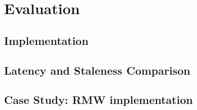 \section{Evaluation}
\label{sec:eval}
\subsection{Implementation}
\subsection{Latency and Staleness Comparison}
\subsection{Case Study: RMW implementation}

